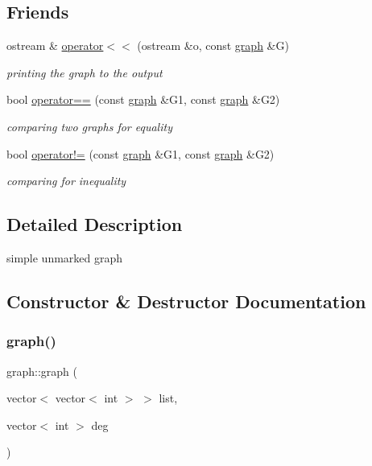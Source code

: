 \subsection*{Friends}
\begin{DoxyCompactItemize}
\item 
ostream \& \hyperlink{classgraph_abe8832440fa24b6a6c152dbc3736c908}{operator$<$$<$} (ostream \&o, const \hyperlink{classgraph}{graph} \&G)
\begin{DoxyCompactList}\small\item\em printing the graph to the output \end{DoxyCompactList}\item 
bool \hyperlink{classgraph_a156c8acaca113a7e5cc8d918dd1fc3f3}{operator==} (const \hyperlink{classgraph}{graph} \&G1, const \hyperlink{classgraph}{graph} \&G2)
\begin{DoxyCompactList}\small\item\em comparing two graphs for equality \end{DoxyCompactList}\item 
bool \hyperlink{classgraph_a004e2b491d4bafaf2d8129e6bc8abc2e}{operator!=} (const \hyperlink{classgraph}{graph} \&G1, const \hyperlink{classgraph}{graph} \&G2)
\begin{DoxyCompactList}\small\item\em comparing for inequality \end{DoxyCompactList}\end{DoxyCompactItemize}


\subsection{Detailed Description}
simple unmarked graph 

\subsection{Constructor \& Destructor Documentation}
\mbox{\label{classgraph_a0f89acfea28c8996a0d8df4d07e6ecf2}} 
\subsubsection{\texorpdfstring{graph()}{graph()}\hspace{0.1cm}{\footnotesize\ttfamily [1/2]}}
{\footnotesize\ttfamily graph\+::graph (\begin{DoxyParamCaption}\item[{vector$<$ vector$<$ int $>$ $>$}]{list,  }\item[{vector$<$ int $>$}]{deg }\end{DoxyParamCaption})}




